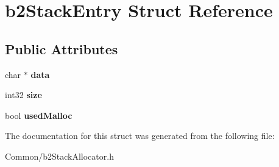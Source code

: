 \hypertarget{structb2StackEntry}{}\section{b2\+Stack\+Entry Struct Reference}
\label{structb2StackEntry}
\subsection*{Public Attributes}
\begin{DoxyCompactItemize}
\item 
\mbox{\label{structb2StackEntry_af98aedeec2c20af0b7d3508a687ddd86}} 
char $\ast$ {\bfseries data}
\item 
\mbox{\label{structb2StackEntry_a910c62f05317f8906224b2569e0cb344}} 
int32 {\bfseries size}
\item 
\mbox{\label{structb2StackEntry_a581b5e4699bb66a28ec0727497a4e478}} 
bool {\bfseries used\+Malloc}
\end{DoxyCompactItemize}


The documentation for this struct was generated from the following file\+:\begin{DoxyCompactItemize}
\item 
Common/b2\+Stack\+Allocator.\+h\end{DoxyCompactItemize}
